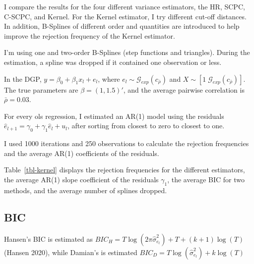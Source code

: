 \documentclass[
]{article}
\begin{document}
I compare the results for the four different variance estimators, the
HR, SCPC, C-SCPC, and Kernel. For the Kernel estimator, I try different
cut-off distances. In addition, B-Splines of different order and
quantities are introduced to help improve the rejection frequency of the
Kernel estimator.

I'm using one and two-order B-Splines (step functions and triangles).
During the estimation, a spline was dropped if it contained one
observation or less.

In the DGP, \(y=\beta_0 + \beta_1 x_l +e_l\), where
\(e_l\sim\mathcal{G}_{exp}(c_{\bar\rho})\) and
\(X\sim[1 \;\mathcal{G}_{exp}(c_{\bar\rho})]\). The true parameters are
\(\beta=(1, 1.5)'\), and the average pairwise correlation is
\(\bar\rho=0.03\).

For every ols regression, I estimated an AR(1) model using the residuals
\(\hat{e}_{l+1}=\gamma_0+\gamma_1 \hat{e}_l + u_l\), after sorting from
closest to zero to closest to one.

I used 1000 iterations and 250 observations to calculate the rejection
frequencies and the average AR(1) coefficients of the residuals.

Table~\ref{tbl-kernel} displays the rejection frequencies for the
different estimators, the average AR(1) slope coefficient of the
residuals \(\gamma_1\), the average BIC for two methods, and the average
number of splines dropped.

\hypertarget{bic}{%
\subsection{BIC}\label{bic}}

Hansen's BIC is estimated as
\(BIC_H=T\log(2\pi\hat{\sigma}^2_{e_l})+T+(k+1)\log(T)\) (Hansen 2020),
while Damian's is estimated
\(BIC_D=T\log(\hat{\sigma}^2_{e_l})+k\log(T)\)
\end{document}
